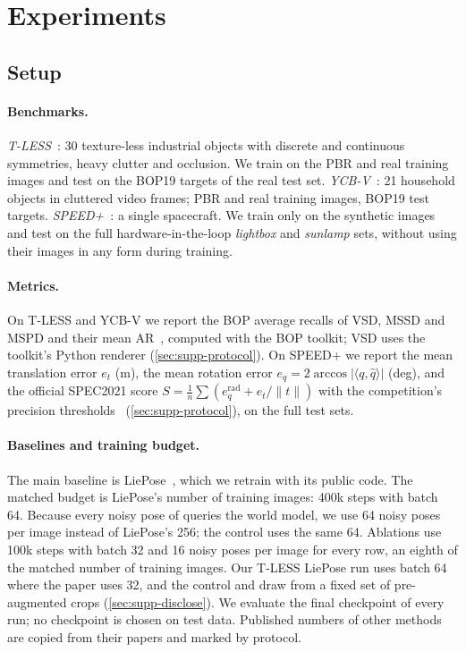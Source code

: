 \section{Experiments}
\label{sec:exp}

\subsection{Setup}
\label{sec:setup}

\paragraph{Benchmarks.}
\emph{T-LESS}~\cite{hodan2017tless}: 30 texture-less industrial objects with discrete and continuous symmetries, heavy clutter and
occlusion. We train on the PBR and real training images and test on the BOP19 targets of the real test set. \emph{YCB-V}~\cite{xiang2018posecnn}:
21 household objects in cluttered video frames; PBR and real training images, BOP19 test targets.
\emph{SPEED+}~\cite{park2022speedplus}: a single spacecraft. We train only on the synthetic images and test on the full
hardware-in-the-loop \emph{lightbox} and \emph{sunlamp} sets, without using their images in any form during training.

\paragraph{Metrics.}
On T-LESS and YCB-V we report the BOP average recalls of VSD, MSSD and MSPD and their mean AR~\cite{hodan2020bop}, computed with the
BOP toolkit; VSD uses the toolkit's Python renderer (\cref{sec:supp-protocol}). On SPEED+ we report the mean translation error
$e_t$ (m), the mean rotation error $e_q=2\arccos|\langle q,\hat q\rangle|$ (deg), and the official SPEC2021 score
$S=\tfrac{1}{n}\sum(e_q^{\mathrm{rad}}+e_t/\|t\|)$ with the competition's precision thresholds~\cite{park2022speedplus}
(\cref{sec:supp-protocol}), on the full test sets.

\paragraph{Baselines and training budget.}
The main baseline is LiePose~\cite{hsiao2024liepose}, which we retrain with its public code. The matched budget is LiePose's number of
training images: 400k steps with batch 64. Because every noisy pose of \method queries the world model, we use 64 noisy poses per
image instead of LiePose's 256; the control uses the same 64. Ablations use 100k steps with batch 32 and 16 noisy poses per image
for every row, an eighth of the matched number of training images. Our T-LESS LiePose run uses batch 64 where the paper uses 32, and the control and \method draw
from a fixed set of pre-augmented crops (\cref{sec:supp-disclose}). We evaluate the final checkpoint of every run; no checkpoint is
chosen on test data. Published numbers of other methods are copied from their papers and marked by protocol.

